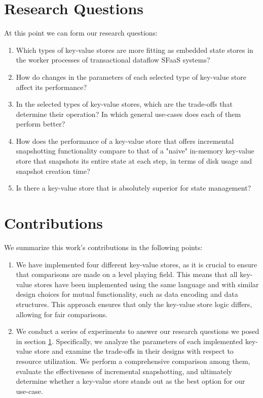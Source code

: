 \section{Research Questions}
\label{section-reseach-questions}

At this point we can form our research questions:

\begin{enumerate}
    \item Which types of key-value stores are more fitting as embedded state stores in the worker processes of transactional dataflow SFaaS systems?
    \item How do changes in the parameters of each selected type of key-value store affect its performance?
    \item In the selected types of key-value stores, which are the trade-offs that determine their operation? In which general use-cases does each of them perform better?
    \item How does the performance of a key-value store that offers incremental snapshotting functionality compare to that of a "naive" in-memory key-value store that snapshots its entire state at each step, in terms of disk usage and snapshot creation time?
    \item Is there a key-value store that is absolutely superior for state management? %
\end{enumerate}

\section{Contributions}

We summarize this work's contributions in the following points:

\begin{enumerate}
    \item We have implemented four different key-value stores, as it is crucial to ensure that comparisons are made on a level playing field. This means that all key-value stores have been implemented using the same language and with similar design choices for mutual functionality, such as data encoding and data structures. This approach ensures that only the key-value store logic differs, allowing for fair comparisons.
    
    \item We conduct a series of experiments to answer our research questions we posed in section \ref{section-reseach-questions}. Specifically, we analyze the parameters of each implemented key-value store and examine the trade-offs in their designs with respect to resource utilization. We perform a comprehensive comparison among them, evaluate the effectiveness of incremental snapshotting, and ultimately determine whether a key-value store stands out as the best option for our use-case.
\end{enumerate}

